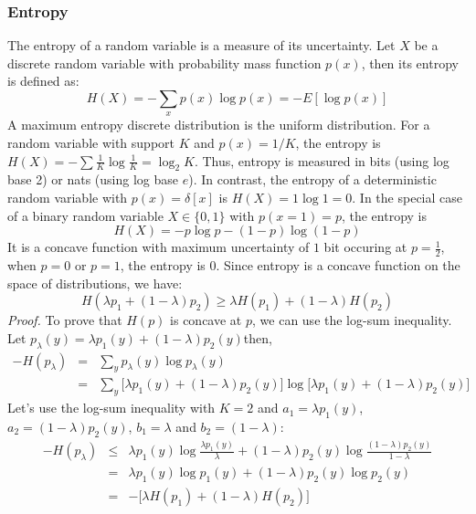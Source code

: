 \subsubsection{Entropy}

The entropy of a random variable is a measure of its uncertainty. Let $X$ be a discrete random variable with probability mass function $p(x)$, then its entropy is defined as:
\begin{equation}
    H(X) = -\sum_{x} p(x) \log p(x) = -E[\log p(x)]
\end{equation}
A maximum entropy discrete distribution is the uniform distribution. For a random variable with support $K$ and $p(x)=1/K$, the entropy is $H(X)= -\sum \frac{1}{K} \log \frac{1}{K} = \log_2 K$. Thus, entropy is measured in bits (using log base 2) or nats (using log base $e$). In contrast, the entropy of a deterministic random variable with $p(x) = \delta[x]$ is $H(X) = 1\log 1 = 0$. In the special case of a binary random variable $X \in \{0,1\}$ with $p(x=1)=p$, the entropy is
\begin{equation}
    H(X) = -p \log p - (1-p)\log (1-p)
\end{equation}
It is a concave function with maximum uncertainty of $1$ bit occuring at $p=\frac{1}{2}$, when $p=0$ or $p=1$, the entropy is $0$. Since entropy is a concave function on the space of distributions, we have:
\begin{equation}
    H(\lambda p_1 + (1-\lambda) p_2) \geq \lambda H(p_1) + (1-\lambda) H(p_2)
\end{equation}
\textit{Proof.} To prove that $H(p)$ is concave at $p$, we can use the log-sum inequality. Let $p_\lambda(y) = \lambda p_1(y) + (1-\lambda)p_2(y)$then,
\begin{eqnarray}
    -H(p_\lambda) &=& \sum_y p_\lambda(y) \log p_\lambda(y) \\ \nonumber
    &=& \sum_y \big[\lambda p_1(y) + (1-\lambda)p_2(y)\big] \log \big[\lambda p_1(y) + (1-\lambda)p_2(y) \big]
\end{eqnarray}
Let's use the log-sum inequality with $K=2$ and $a_1 = \lambda p_1(y)$, $a_2 = (1-\lambda)p_2(y)$, $b_1 = \lambda$ and $b_2 = (1-\lambda)$:
\begin{eqnarray}
    -H(p_\lambda) &\leq& \lambda p_1(y)\log \frac{\lambda p_1(y)}{\lambda} + (1-\lambda)p_2(y)\log \frac{(1-\lambda)p_2(y)}{1-\lambda} \\ \nonumber
    &=& \lambda p_1(y)\log p_1(y) + (1-\lambda)p_2(y)\log p_2(y) \\ \nonumber
    &=& -\big[\lambda H(p_1) + (1-\lambda)H(p_2)\big]
\end{eqnarray}


